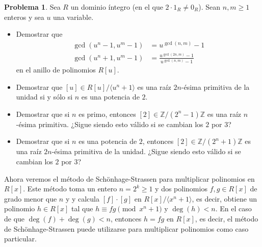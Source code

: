\documentclass[a4paper, 11pt]{article}
\newcommand{\ZZ}{\mathbb{Z}}
\newcounter{numerodetema}
\theoremstyle{plain}
\theoremstyle{definition}
\newtheorem{prob}{Problema}[numerodetema]
\begin{document}
\begin{prob}
Sea $R$ un dominio íntegro (en el que $2\cdot 1_R\neq 0_R$).
Sean $n,m\geq 1$ enteros y sea $u$ una variable.
\begin{itemize}
\item Demostrar que
\[
\begin{aligned}
   \gcd(u^n-1,u^m-1) &=u^{\gcd(n,m)}-1 \\
   \gcd(u^n+1,u^m-1) &=\frac{u^{\gcd(2n,m)}-1}{u^{\gcd(n,m)}-1}
\end{aligned}
\]
en el anillo de polinomios $R[u]$.
\item Demostrar que $[u]\in R[u]/\langle u^n+1\rangle$ es una
raíz $2n$-ésima primitiva de la unidad si y sólo si $n$ es una
potencia de $2$.
\item Demostrar que si $n$ es primo, entonces $[2]\in\ZZ/(2^n-1)\ZZ$ es
una raíz $n$-ésima primitiva. ¿Sigue siendo esto válido si se cambian los $2$
por $3$?
\item Demostrar que si $n$ es una potencia de $2$, entonces
$[2]\in\ZZ/(2^n+1)\ZZ$ es una raíz $2n$-ésima primitiva de la unidad.
¿Sigue siendo esto válido si se cambian los $2$ por $3$?
\end{itemize}
\end{prob}

Ahora veremos el método de Schönhage-Strassen para multiplicar
polinomios en $R[x]$. Este método toma un entero $n=2^k\geq 1$ y dos
polinomios $f,g\in R[x]$ de grado menor que $n$ y y calcula $[f]\cdot[g]$
en $R[x]/\langle x^n+1\rangle$, es decir, obtiene un polinomio
$h\in R[x]$ tal que $h\equiv fg\pmod{x^n+1}$ y $\deg(h)<n$.
En el caso de que $\deg(f)+\deg(g)<n$, entonces $h=fg$ en $R[x]$, es
decir, el método de Schönhage-Strassen puede utilizarse para multiplicar
polinomios como caso particular.

\bigskip
\end{document}
